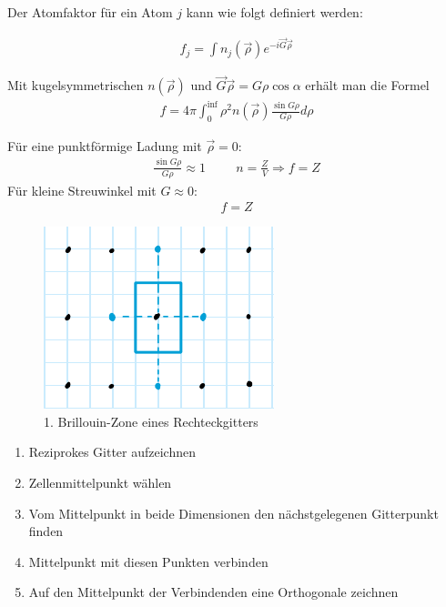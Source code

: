 Der Atomfaktor für ein Atom $j$ kann wie folgt definiert werden:

\begin{align}
f_j = \int n_j (\vec{\rho}) e^{-i \vec{G} \vec{\rho}}
\end{align}

Mit kugelsymmetrischen $n(\vec{\rho})$ und $\vec{G} \vec{\rho} = G \rho \cos{\alpha}$ erhält man die Formel
\begin{align}
f = 4 \pi \int_0 ^{\inf} \rho^2 n(\vec{\rho}) \frac{\sin{G \rho}}{G \rho} d\rho
\end{align}

Für eine punktförmige Ladung mit $\vec{\rho} = 0$:
\begin{align}
\frac{\sin{G \rho}}{G \rho} \approx 1 \hspace{1cm} n = \frac{Z}{V} \Rightarrow f = Z
\end{align}
Für kleine Streuwinkel mit $G \approx 0$:
\begin{align}
f = Z
\end{align}

\label{q:28}

\begin{figure}[H]
    \centering
    \begin{samepage}
        \includegraphics[width=0.4\linewidth]{resources/09-05-2012/BZ1.pdf}
        \caption[1. BZ Rechteckgitter]{1. Brillouin-Zone eines Rechteckgitters}
        \label{fig:BZ1_rechteckgitter}
    \end{samepage}
\end{figure}
\begin{enumerate}
    \item Reziprokes Gitter aufzeichnen
    \item Zellenmittelpunkt wählen
    \item Vom Mittelpunkt in beide Dimensionen den nächstgelegenen Gitterpunkt finden
    \item Mittelpunkt mit diesen Punkten verbinden
    \item Auf den Mittelpunkt der Verbindenden eine Orthogonale zeichnen
\end{enumerate}

